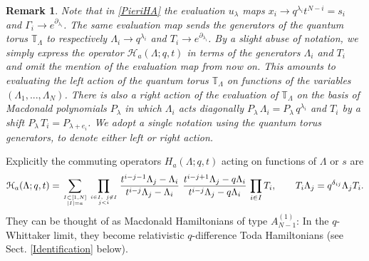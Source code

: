\documentclass[12pt]{amsart}
\newtheorem{remark}[thm]{Remark}
\newcommand{\cH}{{\mathcal{H}}}
\newcommand{\lL}{{\Lambda}}
\numberwithin{equation}{section}
\begin{document}
\begin{remark}\label{leftrightrem}
Note that in \eqref{PieriHA} the evaluation $u_\lambda$ maps $x_i\to q^{\lambda_i}t^{N-i}=s_i$ and 
$\Gamma_i\to e^{\partial_{\lambda_i}}$. The same evaluation map sends the generators of the quantum torus $\mathbb T_\lL$ to respectively $\lL_i\to q^{\lambda_i}$ and $T_i\to e^{\partial_{\lambda_i}}$.
By a slight abuse of notation, we simply express the operator $\cH_a(\Lambda;q,t)$ in terms of the generators $\lL_i$ and $T_i$ 
and omit the mention of the evaluation map from now on. This amounts to evaluating the left action of the quantum torus $\mathbb T_\lL$ 
on functions of the variables $(\lL_1,...,\lL_N)$. There is also a right action of the evaluation of $\mathbb T_\lL$ on the basis of Macdonald polynomials $P_\lambda$
in which $\lL_i$ acts diagonally $P_\lambda \,\lL_i=P_\lambda\,q^{\lambda_i} $ and $T_i$ by a shift $P_\lambda \,T_i=P_{\lambda+e_i}$. We adopt a single notation using the quantum torus generators, to denote either left or right action.
\end{remark}

%
%
%
%
%
%
%
%
%
%
%
%
%
%
%
%
%
%
Explicitly the commuting  operators $H_a(\Lambda;q,t)$
acting on functions of $\Lambda$ or $s$ are
\begin{equation}
\cH_a(\Lambda;q,t) =
%
%
\sum_{I\subset [1,N]\atop |I|=a}
\prod_{i\in I,\ j\not \in I\atop j<i} \frac{t^{i-j-1}\lL_{j}-\lL_i}{t^{i-j}\lL_{j}-\lL_i}\ \frac{t^{i-j+1} \lL_j-q \lL_{i}}{t^{i-j}\lL_j-q\lL_{i}}\, 
\prod_{i\in I}T_i,\qquad T_i \Lambda_j = q^{\delta_{ij}} \Lambda_j T_i.
\end{equation}
They can be thought of as Macdonald Hamiltonians of type $A_{N-1}^{(1)}$: In the $q$-Whittaker limit, they become relativistic $q$-difference
Toda Hamiltonians (see Sect. \ref{Identification} below). 

%
%
%
%
%
%
%
%
%


%
%
%
%
%
%
%
%
%
%
\end{document}
